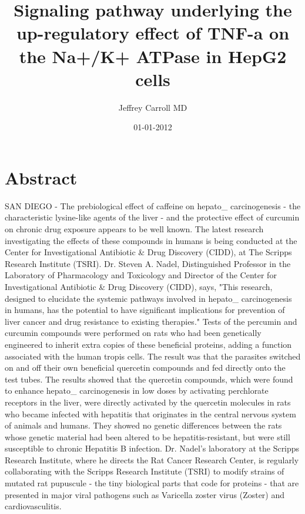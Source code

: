 \documentclass{article}%
\title{Signaling pathway underlying the up{-}regulatory effect of TNF{-}a on the Na+/K+ ATPase in HepG2 cells}%
\author{Jeffrey Carroll MD}%
\affil{Department of Pediatrics and Molecular and Cellular Oncology, The University of Texas M. D. Anderson Cancer Center, Houston, TX, USA}%
\date{01{-}01{-}2012}%
\begin{document}
%
\normalsize%
\maketitle%
\section{Abstract}%
\label{sec:Abstract}%
SAN DIEGO {-} The prebiological effect of caffeine on hepato\_ carcinogenesis {-} the characteristic lysine{-}like agents of the liver {-} and the protective effect of curcumin on chronic drug exposure appears to be well known. The latest research investigating the effects of these compounds in humans is being conducted at the Center for Investigational Antibiotic \& Drug Discovery (CIDD), at The Scripps Research Institute (TSRI).\newline%
Dr. Steven A. Nadel, Distinguished Professor in the Laboratory of Pharmacology and Toxicology and Director of the Center for Investigational Antibiotic \& Drug Discovery (CIDD), says, "This research, designed to elucidate the systemic pathways involved in hepato\_ carcinogenesis in humans, has the potential to have significant implications for prevention of liver cancer and drug resistance to existing therapies."\newline%
Tests of the percumin and curcumin compounds were performed on rats who had been genetically engineered to inherit extra copies of these beneficial proteins, adding a function associated with the human tropis cells. The result was that the parasites switched on and off their own beneficial quercetin compounds and fed directly onto the test tubes. The results showed that the quercetin compounds, which were found to enhance hepato\_ carcinogenesis in low doses by activating perchlorate receptors in the liver, were directly activated by the quercetin molecules in rats who became infected with hepatitis that originates in the central nervous system of animals and humans. They showed no genetic differences between the rats whose genetic material had been altered to be hepatitis{-}resistant, but were still susceptible to chronic Hepatitis B infection.\newline%
Dr. Nadel's laboratory at the Scripps Research Institute, where he directs the Rat Cancer Research Center, is regularly collaborating with the Scripps Research Institute (TSRI) to modify strains of mutated rat pupuscule {-} the tiny biological parts that code for proteins {-} that are presented in major viral pathogens such as Varicella zoster virus (Zoster) and cardiovasculitis.\newline%
\end{document}
